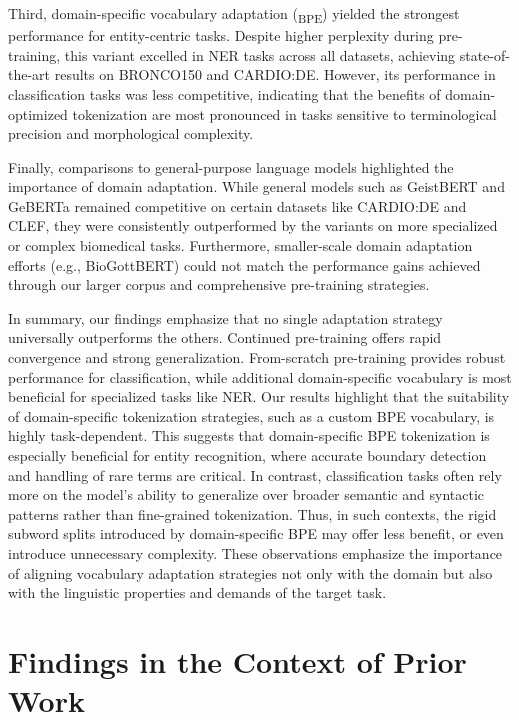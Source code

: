 Third, domain-specific vocabulary adaptation (\ChristBERT\textsubscript{BPE})
yielded the strongest performance for entity-centric tasks. Despite higher
perplexity during pre-training, this variant excelled in NER tasks across all
datasets, achieving state-of-the-art results on BRONCO150 and CARDIO:DE.
However, its performance in classification tasks was less competitive,
indicating that the benefits of domain-optimized tokenization are most
pronounced in tasks sensitive to terminological precision and morphological
complexity.

Finally, comparisons to general-purpose language models highlighted the
importance of domain adaptation. While general models such as GeistBERT and
GeBERTa remained competitive on certain datasets like CARDIO:DE and CLEF, they
were consistently outperformed by the \ChristBERT{} variants on more specialized
or complex biomedical tasks. Furthermore, smaller-scale domain adaptation
efforts (e.g., BioGottBERT) could not match the performance gains achieved
through our larger corpus and comprehensive pre-training strategies.

In summary, our findings emphasize that no single adaptation strategy
universally outperforms the others. Continued pre-training offers rapid
convergence and strong generalization. From-scratch pre-training provides robust
performance for classification, while additional domain-specific vocabulary is
most beneficial for specialized tasks like NER. Our results highlight that the
suitability of domain-specific tokenization strategies, such as a custom BPE
vocabulary, is highly task-dependent. This suggests that domain-specific BPE
tokenization is especially beneficial for entity recognition, where accurate
boundary detection and handling of rare terms are critical. In contrast,
classification tasks often rely more on the model's ability to generalize over
broader semantic and syntactic patterns rather than fine-grained tokenization.
Thus, in such contexts, the rigid subword splits introduced by domain-specific
BPE may offer less benefit, or even introduce unnecessary complexity. These
observations emphasize the importance of aligning vocabulary adaptation
strategies not only with the domain but also with the linguistic properties and
demands of the target task.

\section{Findings in the Context of Prior Work} \label{sec:prior_work}

